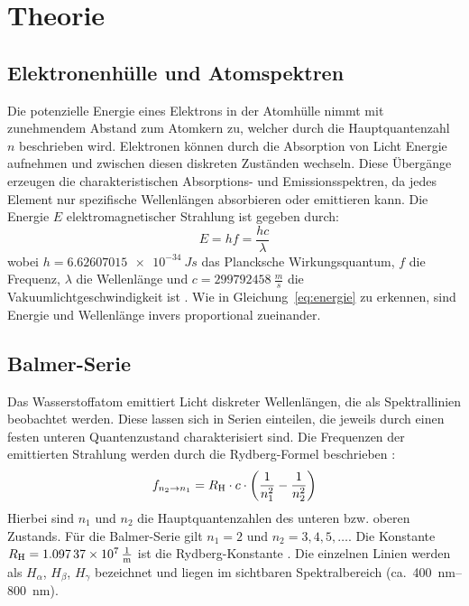 \section{Theorie}
\subsection{Elektronenhülle und Atomspektren}
Die potenzielle Energie eines Elektrons in der Atomhülle nimmt mit zunehmendem Abstand zum Atomkern zu, welcher durch die Hauptquantenzahl~$n$ beschrieben wird. Elektronen können durch die Absorption von Licht Energie aufnehmen und zwischen diesen diskreten Zuständen wechseln. Diese Übergänge erzeugen die charakteristischen Absorptions- und Emissionsspektren, da jedes Element nur spezifische Wellenlängen absorbieren oder emittieren kann.
Die Energie $E$ elektromagnetischer Strahlung ist gegeben durch:
\begin{equation}
  E = h f = \frac{h c}{\lambda}
  \label{eq:energie}
\end{equation}
wobei $h = \SI{6,62607015e-34}{Js}$ das Plancksche Wirkungsquantum, $f$ die Frequenz, $\lambda$ die Wellenlänge und $c = \SI{299792458}{\frac{m}{s}}$ die Vakuumlichtgeschwindigkeit ist \cite[10]{gobel_new_2019}. Wie in Gleichung~\ref{eq:energie} zu erkennen, sind Energie und Wellenlänge invers proportional zueinander.

\subsection{Balmer-Serie}
Das Wasserstoffatom emittiert Licht diskreter Wellenlängen, die als Spektrallinien beobachtet werden. Diese lassen sich in Serien einteilen, die jeweils durch einen festen unteren Quantenzustand charakterisiert sind. Die Frequenzen der emittierten Strahlung werden durch die Rydberg-Formel beschrieben \cite[23--24]{skript}:
\begin{equation}
  f_{n_2 \rightarrow n_1} = R_{\ce{H}} \cdot c \cdot \left(\frac{1}{n_1^2} - \frac{1}{n_2^2}\right)
  \label{eq:balmer-frequenz}
\end{equation}
Hierbei sind $n_1$ und $n_2$ die Hauptquantenzahlen des unteren bzw. oberen Zustands. Für die Balmer-Serie gilt $n_1 = 2$ und $n_2 = 3,4,5,\dots$. Die Konstante $R_{\ce{H}} = \SI{1,09737e7}{\frac{1}{m}}$ ist die Rydberg-Konstante \cite{nist_constants}. Die einzelnen Linien werden als $H_\alpha$, $H_\beta$, $H_\gamma$ bezeichnet und liegen im sichtbaren Spektralbereich (ca.~\SIrange{400}{800}{nm}).

